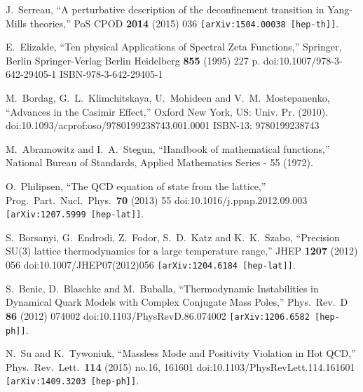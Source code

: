 \documentclass[a4paper,11pt,british,twosides]{book}%
\numberwithin{equation}{section}
\begin{document}
\begin{thebibliography}{9}
  J.~Serreau,
  ``A perturbative description of the deconfinement transition in Yang-Mills theories,''
  PoS CPOD {\bf 2014} (2015) 036
  {\tt [arXiv:1504.00038 [hep-th]]}.

  E.~Elizalde, 
  ``Ten physical Applications of Spectral Zeta Functions,''
  Springer, Berlin
  Springer-Verlag Berlin Heidelberg {\bf 855} (1995) 227 p.
  doi:10.1007/978-3-642-29405-1
  ISBN-978-3-642-29405-1

  M.~Bordag, G.~L.~Klimchitskaya, U.~Mohideen and V.~M.~Mostepanenko, 
  ``Advances in the Casimir Effect,''  
  Oxford New York, US: Univ. Pr. (2010).
  doi:10.1093/acprof:oso/9780199238743.001.0001
  ISBN-13: 9780199238743

  M.~Abramowitz and I.~A.~Stegun, 
  ``Handbook of mathematical functions,'' 
  National Bureau of Standards, Applied Mathematics Series - 55 (1972).

  O.~Philipsen,
  ``The QCD equation of state from the lattice,''
  Prog.\ Part.\ Nucl.\ Phys.\  {\bf 70} (2013) 55
  doi:10.1016/j.ppnp.2012.09.003
  {\tt [arXiv:1207.5999 [hep-lat]]}.

  S.~Borsanyi, G.~Endrodi, Z.~Fodor, S.~D.~Katz and K.~K.~Szabo,
  ``Precision SU(3) lattice thermodynamics for a large temperature range,''
  JHEP {\bf 1207} (2012) 056
  doi:10.1007/JHEP07(2012)056
  {\tt [arXiv:1204.6184 [hep-lat]]}.

  S.~Benic, D.~Blaschke and M.~Buballa,
  ``Thermodynamic Instabilities in Dynamical Quark Models with Complex Conjugate Mass Poles,''
  Phys.\ Rev.\ D {\bf 86} (2012) 074002
  doi:10.1103/PhysRevD.86.074002
  {\tt [arXiv:1206.6582 [hep-ph]]}.

  N.~Su and K.~Tywoniuk,
  ``Massless Mode and Positivity Violation in Hot QCD,''
  Phys.\ Rev.\ Lett.\  {\bf 114} (2015) no.16,  161601
  doi:10.1103/PhysRevLett.114.161601
  {\tt [arXiv:1409.3203 [hep-ph]]}.


\end{thebibliography}
\end{document}
